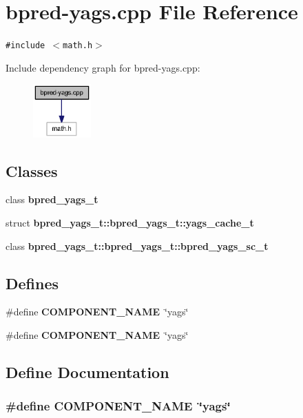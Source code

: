 \section{bpred-yags.cpp File Reference}
\label{bpred-yags_8cpp}
{\tt \#include $<$math.h$>$}\par


Include dependency graph for bpred-yags.cpp:\nopagebreak
\begin{figure}[H]
\begin{center}
\leavevmode
\includegraphics[width=63pt]{bpred-yags_8cpp__incl}
\end{center}
\end{figure}
\subsection*{Classes}
\begin{CompactItemize}
\item 
class {\bf bpred\_\-yags\_\-t}
\item 
struct {\bf bpred\_\-yags\_\-t::bpred\_\-yags\_\-t::yags\_\-cache\_\-t}
\item 
class {\bf bpred\_\-yags\_\-t::bpred\_\-yags\_\-t::bpred\_\-yags\_\-sc\_\-t}
\end{CompactItemize}
\subsection*{Defines}
\begin{CompactItemize}
\item 
\#define {\bf COMPONENT\_\-NAME}~\char`\"{}yags\char`\"{}
\item 
\#define {\bf COMPONENT\_\-NAME}~\char`\"{}yags\char`\"{}
\end{CompactItemize}


\subsection{Define Documentation}
\subsubsection[{COMPONENT\_\-NAME}]{\setlength{\rightskip}{0pt plus 5cm}\#define COMPONENT\_\-NAME~\char`\"{}yags\char`\"{}}\label{zesto-bpred_8cpp_9146ade7ce24e3db226a973a59063892}


